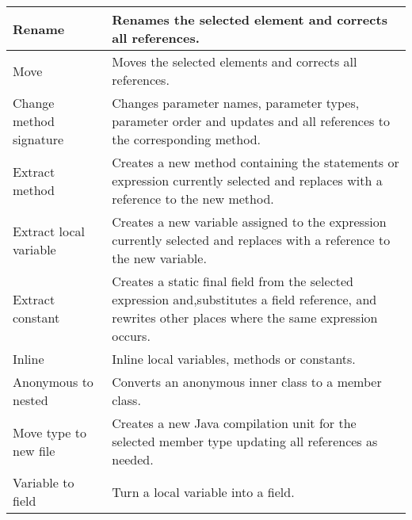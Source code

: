 \begin{table}[h]
\begin{tabular}{p{3 cm} | p{10.5 cm}}
Rename                    & Renames the selected element and corrects all references.                                                                                                                 \\ \hline
Move                      & Moves the selected elements and corrects all references.                                                                                                                  \\ \hline
Change method signature   & Changes parameter names, parameter types, parameter order and updates and all references to the corresponding method.                                                     \\ \hline
Extract method            & Creates a new method containing the statements or expression currently selected and replaces with a reference to the new method.                                          \\ \hline
Extract local variable    & Creates a new variable assigned to the expression currently selected and replaces with a reference to the new variable.                                                   \\ \hline
Extract constant          & Creates a static final field from the selected expression and,substitutes a field reference, and rewrites other places where the same expression occurs.                  \\ \hline
Inline                    & Inline local variables, methods or constants.                                                                                                                             \\ \hline
Anonymous to nested       & Converts an anonymous inner class to a member class.                                                                                                                      \\ \hline
Move type to new file     & Creates a new Java compilation unit for the selected member type updating all references as needed.                                                                       \\ \hline
Variable to field         & Turn a local variable into a field.                                                                                                                                       \\ \hline

\end{tabular}
\end{table}
